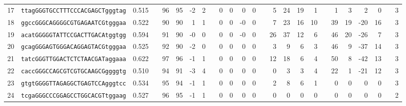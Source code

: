 \begin{tabular}{rlrcrrrrcrrrrcrrrrcrrrrcr}
17 &
 \texttt{ttagGGGTGCCTTTCCCACGAGCTgggtag} &
 0.515 &
 &
 96 &
  95 &
  -2 &
  2 &
  &
 0 &
  0 &
  0 &
  0 &
  &
 5 &
  24 &
  19 &
  1 &
  &
 1 &
  3 &
  2 &
  0 &
  &
 3 \\

18 &
 \texttt{ggccGGGCAGGGGCGTGAGAATCGtgggaa} &
 0.522 &
 &
 90 &
  90 &
  1 &
  1 &
  &
 0 &
  0 &
  -0 &
  0 &
  &
 7 &
  23 &
  16 &
  10 &
  &
 39 &
  19 &
  -20 &
  16 &
  &
 3 \\

19 &
 \texttt{acatGGGGGTATTCCGACTTGACAtggtgg} &
 0.594 &
 &
 91 &
  90 &
  -0 &
  0 &
  &
 0 &
  0 &
  -0 &
  0 &
  &
 26 &
  37 &
  12 &
  6 &
  &
 46 &
  20 &
  -26 &
  7 &
  &
 3 \\

20 &
 \texttt{gcagGGGAGTGGGACAGGAGTACGtgggaa} &
 0.525 &
 &
 92 &
  90 &
  -2 &
  0 &
  &
 0 &
  0 &
  0 &
  0 &
  &
 3 &
  9 &
  6 &
  3 &
  &
 46 &
  9 &
  -37 &
  14 &
  &
 3 \\

21 &
 \texttt{tatcGGGTTGGACTCTCTAACGATaggaaa} &
 0.622 &
 &
 97 &
  96 &
  -1 &
  1 &
  &
 0 &
  0 &
  0 &
  0 &
  &
 12 &
  18 &
  6 &
  4 &
  &
 50 &
  8 &
  -42 &
  13 &
  &
 3 \\

22 &
 \texttt{caccGGGCCAGCGTCGTGCAAGCGggggtg} &
 0.510 &
 &
 94 &
  91 &
  -3 &
  4 &
  &
 0 &
  0 &
  0 &
  0 &
  &
 0 &
  3 &
  3 &
  4 &
  &
 22 &
  1 &
  -21 &
  12 &
  &
 3 \\

23 &
 \texttt{gtgtGGGGTTAGAGGCTGAGTCCAgggtcc} &
 0.534 &
 &
 95 &
  94 &
  -1 &
  1 &
  &
 0 &
  0 &
  0 &
  0 &
  &
 2 &
  8 &
  6 &
  1 &
  &
 0 &
  0 &
  0 &
  0 &
  &
 3 \\

24 &
 \texttt{tcgaGGGCCCGGAGCCTGGCACGTtggaag} &
 0.527 &
 &
 96 &
  95 &
  -1 &
  1 &
  &
 0 &
  0 &
  0 &
  0 &
  &
 0 &
  0 &
  0 &
  0 &
  &
 0 &
  0 &
  0 &
  0 &
  &
 2 \\

\bottomrule
\end{tabular}
